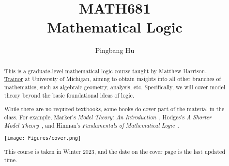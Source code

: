 \documentclass[a4paper]{report}
\author{Pingbang Hu}
\title{MATH681\\Mathematical Logic}
\begin{document}
\maketitle

\begin{abstract}
	This is a graduate-level mathematical logic course taught by \href{http://www-personal.umich.edu/~matthhar/}{Matthew Harrison-Trainor} at University of Michigan, aiming to obtain insights into all other branches of mathematics, such as algebraic geometry, analysis, etc. Specifically, we will cover model theory beyond the basic foundational ideas of logic.

	While there are no required textbooks, some books do cover part of the material in the class. For example, Marker's \emph{Model Theory: An Introduction}~\cite{marker2002model}, Hodges's \emph{A Shorter Model Theory}~\cite{hodges1997shorter}, and Hinman's \emph{Fundamentals of Mathematical Logic}~\cite{hinman2005fundamentals}.

	\vfill
	\begin{center}
		\texttt{[image: Figures/cover.png]}
	\end{center}
	\vfill
	This course is taken in Winter 2023, and the date on the cover page is the last updated time.
\end{abstract}

\tableofcontents


\newpage
\appendix
\appendixpage{}



\newpage
\pagestyle{plain}
\printbibliography{}
\end{document}

